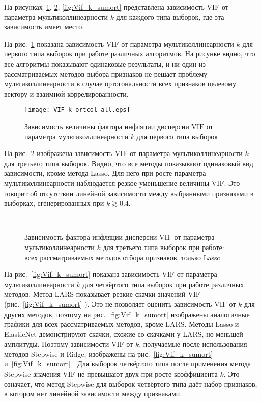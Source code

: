 \documentclass[a4paper,12pt]{article}
\newcommand{\vif}{\mathrm{VIF}}
\begin{document}
На рисунках~\ref{fig:Vif_k_ortcol}, \ref{fig:Vif_k_coltarget}, \ref{fig:Vif_k_sumort} представлена зависимость $\vif$ от параметра мультиколлинеарности $k$ для каждого типа выборок, где эта зависимость имеет место. 

На рис.~\ref{fig:Vif_k_ortcol} показана зависимость $\vif$ от параметра мультиколлинеарности $k$ для первого типа выборок при работе различных алгоритмов. На рисунке видно, что все алгоритмы показывают одинаковые результаты, и ни один из рассматриваемых методов выбора признаков не решает проблему мультиколлинеарности в случае ортогональности всех признаков целевому вектору и взаимной коррелированности.

\begin{figure}[!h]
\centering
\texttt{[image: VIF\_k\_ortcol\_all.eps]}
\caption{Зависимость величины фактора инфляции дисперсии $\vif$ от параметра мультиколлинеарности $k$ для первого типа выборок}
\label{fig:Vif_k_ortcol}
\end{figure} 

На рис.~\ref{fig:Vif_k_coltarget} изображена зависимость $\vif$ от параметра мультиколлинеарности $k$ для третьего типа выборок. Видно, что все методы показывают одинаковый вид зависимости, кроме метода Lasso. Для него при росте параметра мультиколлинеарности наблюдается резкое уменьшение величины $\vif$. Это говорит об отсутствии линейной зависимости между выбранными признаками в выборках, сгенерированных при $k \gtrsim 0.4$.

\begin{figure}[h]
\centering
{}
~
\caption{Зависимость фактора инфляции дисперсии $\vif$ от параметра мультиколлинеарности $k$ для третьего типа выборок при работе:~ всех рассматриваемых методов отбора признаков,  только Lasso}
\label{fig:Vif_k_coltarget}
\end{figure}
На рис.~\ref{fig:Vif_k_sumort} показана зависимость $\vif$ от параметра мультиколлинеарности $k$ для четвёртого типа выборок при работе различных методов. Метод LARS показывает резкие скачки значений $\vif$ (рис.~\ref{fig:Vif_k_sumort} ). Это не позволяет оценить зависимость $\vif$ от $k$ для других методов, поэтому на рис.~\ref{fig:Vif_k_sumort}  изображены аналогичные графики для всех рассматриваемых методов, кроме LARS. Методы Lasso и ElasticNet демонстрируют скачки, схожие со скачками у LARS, но меньшей амплитуды. Поэтому зависимости $\vif$ от $k$, получаемые после использования методов Stepwise и Ridge, изображены на рис.~\ref{fig:Vif_k_sumort}   и~\ref{fig:Vif_k_sumort} . Для выборок четвёртого типа после применения метода Stepwise значения $\vif$ не превышают двух при росте коэффициента $k$. Это означает, что метод Stepwise для выборок четвёртого типа даёт набор признаков, в котором нет линейной зависимости между признаками.   
\end{document}
